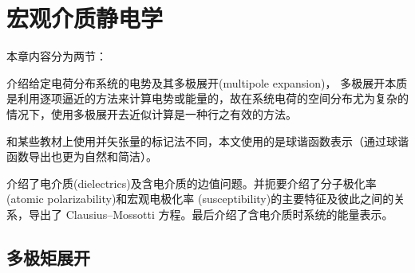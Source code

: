 \chapter{宏观介质静电学}
\label{chap:electrostatics of macroscopic media}

本章内容分为两节：
\begin{compactenum}
    \item {}介绍给定电荷分布系统的电势及其多极展开(multipole expansion)，%
    多极展开本质是利用逐项逼近的方法来计算电势或能量的，故在系统电荷的空间分布尤为复杂的情况下，使用多极展开去近似计算是一种行之有效的方法。
    
    和某些教材上使用并矢张量的标记法不同，本文使用的是球谐函数表示（通过球谐函数导出也更为自然和简洁）。

    \item {}介绍了电介质(dielectrics)及含电介质的边值问题。并扼要介绍了分子极化率(atomic polarizability)和宏观电极化率 (susceptibility)的主要特征及彼此之间的关系，导出了 Clausius--Mossotti 方程。最后介绍了含电介质时系统的能量表示。
\end{compactenum}

\section{多极矩展开}
\label{sec:multipole expansion}

